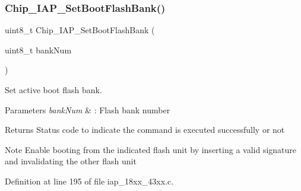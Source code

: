 \subsubsection{\texorpdfstring{Chip\+\_\+\+I\+A\+P\+\_\+\+Set\+Boot\+Flash\+Bank()}{Chip\_IAP\_SetBootFlashBank()}}
{\footnotesize\ttfamily uint8\+\_\+t Chip\+\_\+\+I\+A\+P\+\_\+\+Set\+Boot\+Flash\+Bank (\begin{DoxyParamCaption}\item[{uint8\+\_\+t}]{bank\+Num }\end{DoxyParamCaption})}



Set active boot flash bank. 


\begin{DoxyParams}{Parameters}
{\em bank\+Num} & \+: Flash bank number \\
\hline
\end{DoxyParams}
\begin{DoxyReturn}{Returns}
Status code to indicate the command is executed successfully or not 
\end{DoxyReturn}
\begin{DoxyNote}{Note}
Enable booting from the indicated flash unit by inserting a valid signature and invalidating the other flash unit 
\end{DoxyNote}


Definition at line 195 of file iap\+\_\+18xx\+\_\+43xx.\+c.

